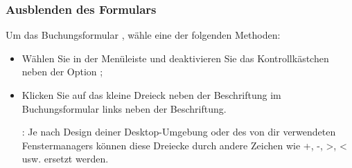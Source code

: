 \subsubsection{Ausblenden des Formulars\label{transactions-new-hide}}

Um das Buchungsformular , wähle eine der folgenden Methoden:

\begin{itemize}
	\item Wählen Sie in der Menüleiste  und deaktivieren Sie das Kontrollkästchen neben der Option ;
	\item Klicken Sie auf das kleine Dreieck neben der Beschriftung  im Buchungsformular links neben der Beschriftung.
	
	\Note{}: Je nach Design deiner Desktop-Umgebung oder des von dir verwendeten Fenstermanagers können diese Dreiecke durch andere Zeichen wie +, -, >, < usw. ersetzt werden.
\end{itemize}


